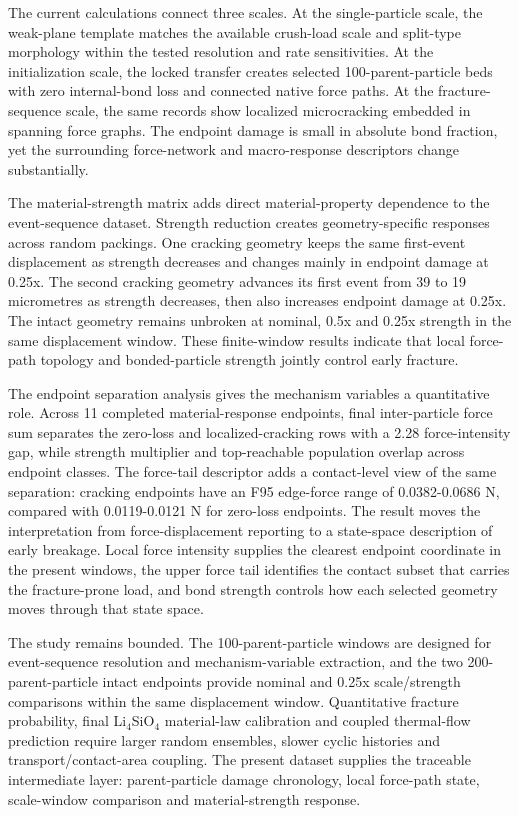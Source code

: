 \documentclass[preprint,12pt]{elsarticle}
\begin{document}
The current calculations connect three scales. At the single-particle scale, the weak-plane template matches the available crush-load scale and split-type morphology within the tested resolution and rate sensitivities. At the initialization scale, the locked transfer creates selected 100-parent-particle beds with zero internal-bond loss and connected native force paths. At the fracture-sequence scale, the same records show localized microcracking embedded in spanning force graphs. The endpoint damage is small in absolute bond fraction, yet the surrounding force-network and macro-response descriptors change substantially.


The material-strength matrix adds direct material-property dependence to the event-sequence dataset. Strength reduction creates geometry-specific responses across random packings. One cracking geometry keeps the same first-event displacement as strength decreases and changes mainly in endpoint damage at 0.25x. The second cracking geometry advances its first event from 39 to 19 micrometres as strength decreases, then also increases endpoint damage at 0.25x. The intact geometry remains unbroken at nominal, 0.5x and 0.25x strength in the same displacement window. These finite-window results indicate that local force-path topology and bonded-particle strength jointly control early fracture.


The endpoint separation analysis gives the mechanism variables a quantitative role. Across 11 completed material-response endpoints, final inter-particle force sum separates the zero-loss and localized-cracking rows with a 2.28 force-intensity gap, while strength multiplier and top-reachable population overlap across endpoint classes. The force-tail descriptor adds a contact-level view of the same separation: cracking endpoints have an F95 edge-force range of 0.0382-0.0686 N, compared with 0.0119-0.0121 N for zero-loss endpoints. The result moves the interpretation from force-displacement reporting to a state-space description of early breakage. Local force intensity supplies the clearest endpoint coordinate in the present windows, the upper force tail identifies the contact subset that carries the fracture-prone load, and bond strength controls how each selected geometry moves through that state space.


The study remains bounded. The 100-parent-particle windows are designed for event-sequence resolution and mechanism-variable extraction, and the two 200-parent-particle intact endpoints provide nominal and 0.25x scale/strength comparisons within the same displacement window. Quantitative fracture probability, final Li$_4$SiO$_4$ material-law calibration and coupled thermal-flow prediction require larger random ensembles, slower cyclic histories and transport/contact-area coupling. The present dataset supplies the traceable intermediate layer: parent-particle damage chronology, local force-path state, scale-window comparison and material-strength response.
\end{document}
